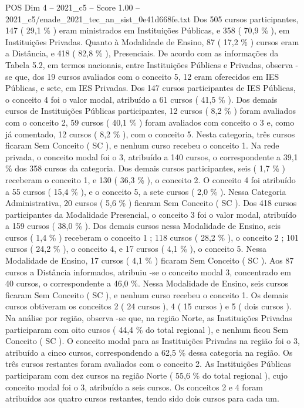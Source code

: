 \begin{textsample}{POS Dim 4 – 2021\_c5 – Score 1.00 – 2021\_c5/enade\_2021\_tec\_an\_sist\_0e41d668fe.txt}
Dos 505 cursos participantes, 147 ( 29,1 \% ) eram ministrados em Instituições Públicas, e 358 ( 70,9 \% ), em Instituições Privadas.
Quanto à Modalidade de Ensino, 87 ( 17,2 \% ) cursos eram a Distância, e 418 ( 82,8 \% ), Presenciais.
De acordo com as informações da Tabela 5.2, em termos nacionais, entre Instituições Públicas e Privadas, observa -se que, dos 19 cursos avaliados com o conceito 5, 12 eram oferecidos em IES Públicas, e sete, em IES Privadas.
Dos 147 cursos participantes de IES Públicas, o conceito 4 foi o valor modal, atribuído a 61 cursos ( 41,5 \% ).
Dos demais cursos de Instituições Públicas participantes, 12 cursos ( 8,2 \% ) foram avaliados com o conceito 2, 59 cursos ( 40,1 \% ) foram avaliados com conceito o 3 e, como já comentado, 12 cursos ( 8,2 \% ), com o conceito 5.
Nesta categoria, três cursos ficaram Sem Conceito ( SC ), e nenhum curso recebeu o conceito 1.
Na rede privada, o conceito modal foi o 3, atribuído a 140 cursos, o correspondente a 39,1 \% dos 358 cursos da categoria.
Dos demais cursos participantes, seis ( 1,7 \% ) receberam o conceito 1, e 130 ( 36,3 \% ), o conceito 2.
O conceito 4 foi atribuído a 55 cursos ( 15,4 \% ), e o conceito 5, a sete cursos ( 2,0 \% ).
Nessa Categoria Administrativa, 20 cursos ( 5,6 \% ) ficaram Sem Conceito ( SC ).
Dos 418 cursos participantes da Modalidade Presencial, o conceito 3 foi o valor modal, atribuído a 159 cursos ( 38,0 \% ).
Dos demais cursos nessa Modalidade de Ensino, seis cursos ( 1,4 \% ) receberam o conceito 1 ; 118 cursos ( 28,2 \% ), o conceito 2 ; 101 cursos ( 24,2 \% ), o conceito 4, e 17 cursos ( 4,1 \% ), o conceito 5.
Nessa Modalidade de Ensino, 17 cursos ( 4,1 \% ) ficaram Sem Conceito ( SC ).
Aos 87 cursos a Distância informados, atribuiu -se o conceito modal 3, concentrado em 40 cursos, o correspondente a 46,0 \%.
Nessa Modalidade de Ensino, seis cursos ficaram Sem Conceito ( SC ), e nenhum curso recebeu o conceito 1.
Os demais cursos obtiveram os conceitos 2 ( 24 cursos ), 4 ( 15 cursos ) e 5 ( dois cursos ).
Na análise por região, observa -se que, na região Norte, as Instituições Privadas participaram com oito cursos ( 44,4 \% do total regional ), e nenhum ficou Sem Conceito ( SC ).
O conceito modal para as Instituições Privadas na região foi o 3, atribuído a cinco cursos, correspondendo a 62,5 \% dessa categoria na região.
Os três cursos restantes foram avaliados com o conceito 2.
As Instituições Públicas participaram com dez cursos na região Norte ( 55,6 \% do total regional ), cujo conceito modal foi o 3, atribuído a seis cursos.
Os conceitos 2 e 4 foram atribuídos aos quatro cursos restantes, tendo sido dois cursos para cada um.

\end{textsample}
